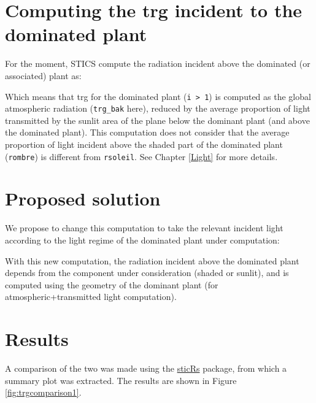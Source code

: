 \documentclass[]{book}
\theoremstyle{definition}
\theoremstyle{definition}
\theoremstyle{definition}
\theoremstyle{remark}
\begin{document}
\section{Computing the trg incident to the dominated
plant}\label{computing-the-trg-incident-to-the-dominated-plant}

For the moment, STICS compute the radiation incident above the dominated
(or associated) plant as:

Which means that trg for the dominated plant
(\texttt{i\ \textgreater{}\ 1}) is computed as the global atmospheric
radiation (\texttt{trg\_bak} here), reduced by the average proportion of
light transmitted by the sunlit area of the plane below the dominant
plant (and above the dominated plant). This computation does not
consider that the average proportion of light incident above the shaded
part of the dominated plant (\texttt{rombre}) is different from
\texttt{rsoleil}. See Chapter \ref{Light} for more details.

\section{Proposed solution}\label{proposed-solution}

We propose to change this computation to take the relevant incident
light according to the light regime of the dominated plant under
computation:

With this new computation, the radiation incident above the dominated
plant depends from the component under consideration (shaded or sunlit),
and is computed using the geometry of the dominant plant (for
atmospheric+transmitted light computation).

\section{Results}\label{results}

A comparison of the two was made using the
\href{https://github.com/VEZY/sticRs}{sticRs} package, from which a
summary plot was extracted. The results are shown in Figure
\ref{fig:trgcomparison1}.
\end{document}
